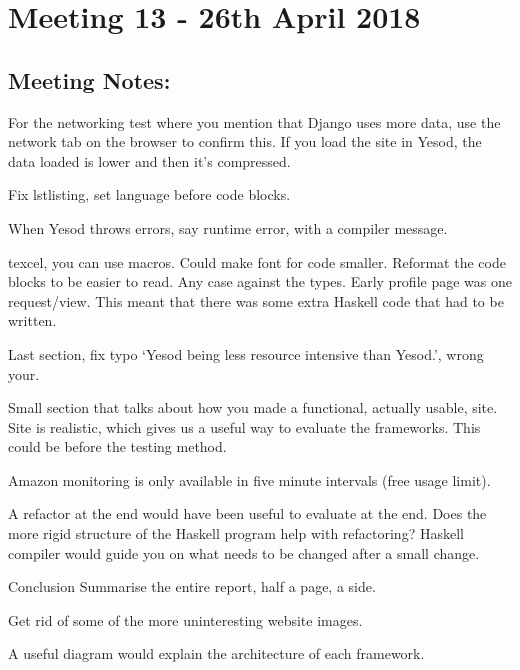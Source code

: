 \section{Meeting 13 - 26th April 2018}

\subsection{Meeting Notes:}


For the networking test where you mention that Django uses more data,
use the network tab on the browser to confirm this. If you load
the site in Yesod, the data loaded is lower and then it's compressed.

Fix lstlisting, set language before code blocks.

When Yesod throws errors, say runtime error, with a compiler message.

texcel, you can use macros. Could make font for code smaller.
Reformat the code blocks to be easier to read.
Any case against the types. Early profile page was one request/view. This meant that
there was some extra Haskell code that had to be written.

Last section, fix typo `Yesod being less resource intensive than Yesod.', wrong
your.

Small section that talks about how you made a functional, actually usable,
site. Site is realistic, which gives us a useful way to evaluate the frameworks.
This could be before the testing method.

Amazon monitoring is only available in five minute intervals (free usage limit).

A refactor at the end would have been useful to evaluate at the end. Does
the more rigid structure of the Haskell program help with refactoring?
Haskell compiler would guide you on what needs to be changed after a
small change.

Conclusion
Summarise the entire report, half a page, a side.

Get rid of some of the more uninteresting website images.

A useful diagram would explain the architecture of each framework.